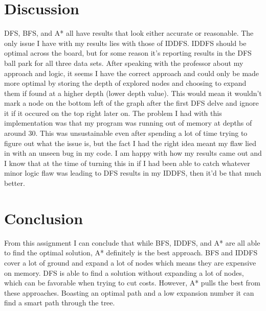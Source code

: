 \documentclass[10pt,draftclsnofoot,onecolumn]{IEEEtran}
\begin{document}
\section{Discussion}
DFS, BFS, and A* all have results that look either accurate or reasonable.
The only issue I have with my results lies with those of IDDFS.
IDDFS should be optimal across the board, but for some reason it's reporting results in the DFS ball park for all three data sets.
After speaking with the professor about my approach and logic, it seems I have the correct approach and could only be made more optimal by storing the depth of explored nodes and choosing to expand them if found at a higher depth (lower depth value).
This would mean it wouldn't mark a node on the bottom left of the graph after the first DFS delve and ignore it if it occured on the top right later on.
The problem I had with this implementation was that my program was running out of memory at depths of around 30.
This was unsustainable even after spending a lot of time trying to figure out what the issue is, but the fact I had the right idea meant my flaw lied in with an unseen bug in my code.
I am happy with how my results came out and I know that at the time of turning this in if I had been able to catch whatever minor logic flaw was leading to DFS results in my IDDFS, then it'd be that much better.

\section{Conclusion}
From this assignment I can conclude that while BFS, IDDFS, and A* are all able to find the optimal solution, A* definitely is the best approach.
BFS and IDDFS cover a lot of ground and expand a lot of nodes which means they are expensive on memory.
DFS is able to find a solution without expanding a lot of nodes, which can be favorable when trying to cut costs.
However, A* pulls the best from these approaches.
Boasting an optimal path and a low expansion number it can find a smart path through the tree.
\end{document}
